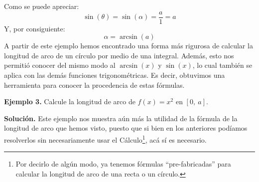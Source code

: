 \documentclass[12pt]{article}
\begin{document}
\begin{figure}[hbt!]
\centering


\end{figure}

Como se puede apreciar:
\[
  \sin(\theta) = \sin(\alpha) = \frac{a}{1} = a
\]
Y, por consiguiente:
\[
  \alpha = \arcsin(a)
\]
A partir de este ejemplo hemos encontrado una forma más rigurosa de calcular la longitud de arco de un círculo por medio de una integral. Además, esto nos permitió conocer del mismo modo al $\arcsin(x)$ y $\sin(x)$, lo cual también se aplica con las demás funciones trigonométricas. Es decir, obtuvimos una herramienta para conocer la procedencia de estas fórmulas.

\textbf{Ejemplo 3.} Calcule la longitud de arco de $f(x) = x^{2}$ en $[0, \ a]$.

\textbf{Solución.} Este ejemplo nos muestra aún más la utilidad de la fórmula de la longitud de arco que hemos visto, puesto que si bien en los anteriores podíamos resolverlos sin necesariamente usar el Cálculo\footnote{Por decirlo de algún modo, ya tenemos fórmulas ``pre-fabricadas'' para calcular la longitud de arco de una recta o un círculo.}, acá sí es necesario.
\end{document}
